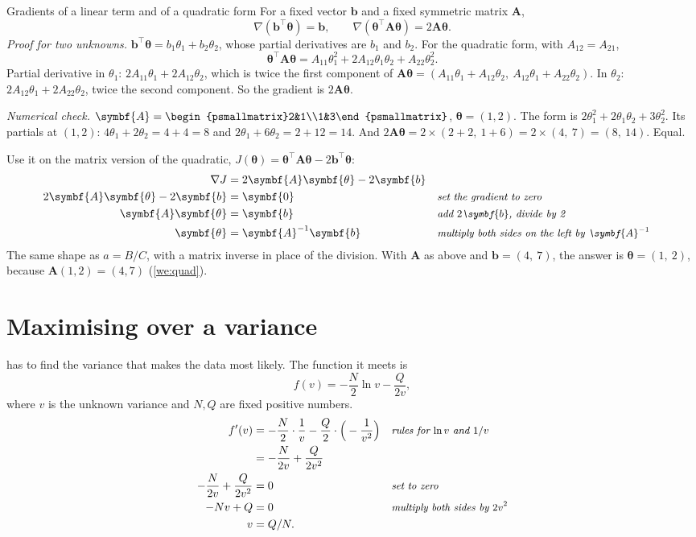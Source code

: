 \documentclass[11pt,a4paper,oneside,openany]{book}
\newcommand{\B}[1]{{\symbf{#1}}}
\newcommand{\B}[1]{{\bm{#1}}}
\newcommand{\T}{^{\top}}
\newcommand{\vb}{\B{b}}
\newcommand{\vtheta}{\B{\theta}}
\newcommand{\mA}{\B{A}}
\newcommand{\why}[1]{&&\text{\small\itshape #1}}
\begin{document}
\begin{rulebox}[label=rule:gradquad]{Gradients of a linear term and of a quadratic form}
For a fixed vector $\vb$ and a fixed symmetric matrix $\mA$,
\[
  \nabla(\vb\T\vtheta)=\vb,\qquad \nabla(\vtheta\T\mA\vtheta)=2\mA\vtheta .
\]
\emph{Proof for two unknowns.} $\vb\T\vtheta=b_1\theta_1+b_2\theta_2$, whose partial derivatives are $b_1$ and $b_2$. For the
quadratic form, with $A_{12}=A_{21}$,
\[
  \vtheta\T\mA\vtheta=A_{11}\theta_1^2+2A_{12}\theta_1\theta_2+A_{22}\theta_2^2 .
\]
Partial derivative in $\theta_1$: $2A_{11}\theta_1+2A_{12}\theta_2$, which is twice the first component of
$\mA\vtheta=(A_{11}\theta_1+A_{12}\theta_2,\ A_{12}\theta_1+A_{22}\theta_2)$. In $\theta_2$: $2A_{12}\theta_1+2A_{22}\theta_2$,
twice the second component. So the gradient is $2\mA\vtheta$.

\emph{Numerical check.} $\mA=\begin{psmallmatrix}2&1\\1&3\end{psmallmatrix}$, $\vtheta=(1,2)$. The form is
$2\theta_1^2+2\theta_1\theta_2+3\theta_2^2$. Its partials at $(1,2)$: $4\theta_1+2\theta_2=4+4=8$ and $2\theta_1+6\theta_2=2+12=14$.
And $2\mA\vtheta=2\times(2+2,\ 1+6)=2\times(4,\ 7)=(8,\ 14)$. Equal.
\end{rulebox}

Use it on the matrix version of the quadratic, $J(\vtheta)=\vtheta\T\mA\vtheta-2\vb\T\vtheta$:
\begin{align*}
\nabla J &= 2\mA\vtheta-2\vb\\
2\mA\vtheta-2\vb &= \B0 \why{set the gradient to zero}\\
\mA\vtheta &= \vb \why{add $2\vb$, divide by 2}\\
\vtheta &= \mA^{-1}\vb \why{multiply both sides on the left by $\mA^{-1}$}
\end{align*}
The same shape as $a=B/C$, with a matrix inverse in place of the division. With $\mA$ as above and $\vb=(4,\ 7)$, the answer is
$\vtheta=(1,\ 2)$, because $\mA(1,2)=(4,7)$ (\cref{we:quad}).

\section{Maximising over a variance}

 has to find the variance that makes the data most likely. The function it meets is
\[
  f(v)=-\frac N2\ln v-\frac{Q}{2v},
\]
where $v$ is the unknown variance and $N,Q$ are fixed positive numbers.
\begin{align*}
f'(v) &= -\frac N2\cdot\frac1v-\frac Q2\cdot\Big(-\frac1{v^2}\Big) \why{rules for $\ln v$ and $1/v$}\\
      &= -\frac{N}{2v}+\frac{Q}{2v^2}\\
-\frac{N}{2v}+\frac{Q}{2v^2} &= 0 \why{set to zero}\\
-Nv+Q &= 0 \why{multiply both sides by $2v^2$}\\
v &= Q/N .
\end{align*}
\end{document}
